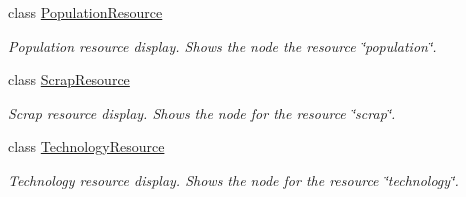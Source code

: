 \begin{DoxyCompactItemize}
class \hyperlink{classClient_1_1Common_1_1Views_1_1HUD_1_1PopulationResource}{Population\+Resource}
\begin{DoxyCompactList}\small\item\em Population resource display. Shows the node the resource \char`\"{}population\char`\"{}. \end{DoxyCompactList}\item 
class \hyperlink{classClient_1_1Common_1_1Views_1_1HUD_1_1ScrapResource}{Scrap\+Resource}
\begin{DoxyCompactList}\small\item\em Scrap resource display. Shows the node for the resource \char`\"{}scrap\char`\"{}. \end{DoxyCompactList}\item 
class \hyperlink{classClient_1_1Common_1_1Views_1_1HUD_1_1TechnologyResource}{Technology\+Resource}
\begin{DoxyCompactList}\small\item\em Technology resource display. Shows the node for the resource \char`\"{}technology\char`\"{}. \end{DoxyCompactList}\end{DoxyCompactItemize}
